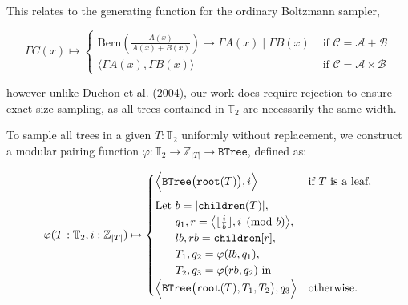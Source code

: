 \documentclass[portrait,a0b,final,a4resizeable]{a0poster}
\def\jointspacing{\vspace{0.3in}}
\begin{document}
\begin{poster}
\begin{multicols}{2}
      \hspace*{2cm}\begin{minipage}[c]{0.90\columnwidth}
      This relates to the generating function for the ordinary Boltzmann sampler,
      \end{minipage}

      \begin{equation*}
        \Gamma C(x) \mapsto \begin{cases}
                              \text{Bern} \left(\frac{A(x)}{A(x) + B(x)}\right) \rightarrow \Gamma A(x) \mid \Gamma B(x) & \text{ if } \mathcal{C}=\mathcal{A}+\mathcal{B} \\
                              \big\langle \Gamma A(x), \Gamma B(x)\big\rangle & \text{ if } \mathcal{C}=\mathcal{A} \times \mathcal{B}
        \end{cases}
      \end{equation*}


      \hspace*{2cm}\begin{minipage}[c]{0.90\columnwidth}
      however unlike Duchon et al. (2004), our work does require rejection to ensure exact-size sampling, as all trees contained in $\mathbb{T}_2$ are necessarily the same width.
      \end{minipage}

      \jointspacing


      \jointspacing

      \hspace*{2cm}\begin{minipage}[c]{0.90\columnwidth}
      To sample all trees in a given $T: \mathbb{T}_2$ uniformly without replacement, we construct a modular pairing function $\varphi: \mathbb{T}_2 \rightarrow \mathbb{Z}_{|T|} \rightarrow \texttt{BTree}$, defined as:
      \end{minipage}

      \begin{equation*}
        \varphi(T: \mathbb{T}_2, i: \mathbb{Z}_{|T|}) \mapsto \begin{cases}
          \Big\langle\texttt{BTree}\big(\texttt{root}(T)\big), i\Big\rangle & \text{if $T$ is a leaf,} \vspace{5pt}\\
          \text{Let } b = |\texttt{children}(T)|,\\
          \phantom{\text{Let }} q_1, r=\big\langle\lfloor\frac{i}{b}\rfloor, i \pmod{b}\big\rangle,\\
          \phantom{\text{Let }} lb, rb = \texttt{children}[r],\\
          \phantom{\text{Let }} T_1, q_2 = \varphi(lb, q_1),\\
          \phantom{\text{Let }} T_2, q_3 = \varphi(rb, q_2) \text{ in } \\
          \Big\langle\texttt{BTree}\big(\texttt{root}(T), T_1, T_2\big), q_3\Big\rangle & \text{otherwise.} \\
        \end{cases}
      \end{equation*}


\end{multicols}
\end{poster}
\end{document}
